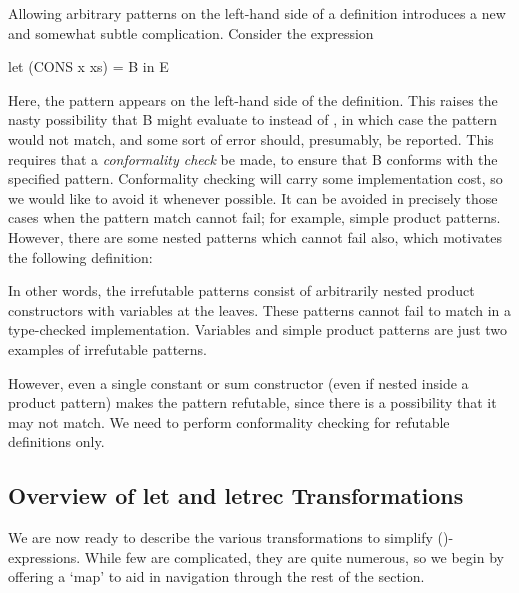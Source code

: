 {Allowing arbitrary patterns on the left-hand side of a definition introduces a
new and somewhat subtle complication. Consider the expression
\begin{mlcoded}
	let (CONS x xs) = B in E
\end{mlcoded}
Here, the pattern  appears on the left-hand side of the definition.
This raises the nasty possibility that B might evaluate to  instead of
, in which case the pattern would not match, and some sort of
error should, presumably, be reported. This requires that a \textit{conformality
check} be made, to ensure that B conforms with the specified pattern.
Conformality checking will carry some implementation cost, so we would
like to avoid it whenever possible. It can be avoided in precisely those cases
when the pattern match cannot fail; for example, simple product patterns.
However, there are some nested patterns which cannot fail also, which
motivates the following definition:



\noindent In other words, the irrefutable patterns consist of arbitrarily nested product
constructors with variables at the leaves. These patterns cannot fail to match
in a type-checked implementation. Variables and simple product patterns are
just two examples of irrefutable patterns.

However, even a single constant or sum constructor (even if nested inside a
product pattern) makes the pattern refutable, since there is a possibility that it
may not match. We need to perform conformality checking for refutable
definitions only.

\subsection{Overview of let and letrec Transformations}
We are now ready to describe the various transformations to simplify ()-
expressions. While few are complicated, they are quite numerous, so we
begin by offering a `map' to aid in navigation through the rest of the section.

}
